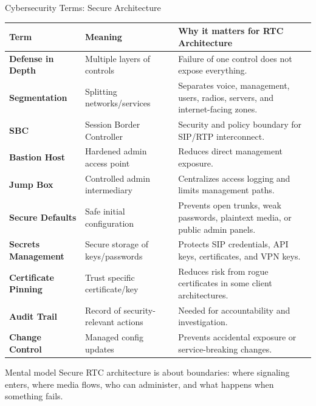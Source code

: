 \documentclass[aspectratio=169]{beamer}
\begin{document}
\begin{frame}{Cybersecurity Terms: Secure Architecture}
\tiny
\begin{tabular}{p{2.2cm} p{3.5cm} p{6.5cm}}
\toprule
\textbf{Term} & \textbf{Meaning} & \textbf{Why it matters for RTC Architecture} \\
\midrule
\textbf{Defense in Depth} & Multiple layers of controls & Failure of one control does not expose everything. \\
\textbf{Segmentation} & Splitting networks/services & Separates voice, management, users, radios, servers, and internet-facing zones. \\
\textbf{SBC} & Session Border Controller & Security and policy boundary for SIP/RTP interconnect. \\
\textbf{Bastion Host} & Hardened admin access point & Reduces direct management exposure. \\
\textbf{Jump Box} & Controlled admin intermediary & Centralizes access logging and limits management paths. \\
\textbf{Secure Defaults} & Safe initial configuration & Prevents open trunks, weak passwords, plaintext media, or public admin panels. \\
\textbf{Secrets Management} & Secure storage of keys/passwords & Protects SIP credentials, API keys, certificates, and VPN keys. \\
\textbf{Certificate Pinning} & Trust specific certificate/key & Reduces risk from rogue certificates in some client architectures. \\
\textbf{Audit Trail} & Record of security-relevant actions & Needed for accountability and investigation. \\
\textbf{Change Control} & Managed config updates & Prevents accidental exposure or service-breaking changes. \\
\bottomrule
\end{tabular}

\vspace{0.15cm}
\begin{block}{Mental model}
Secure RTC architecture is about boundaries: where signaling enters, where media flows, who can administer, and what happens when something fails.
\end{block}
\end{frame}
\end{document}
